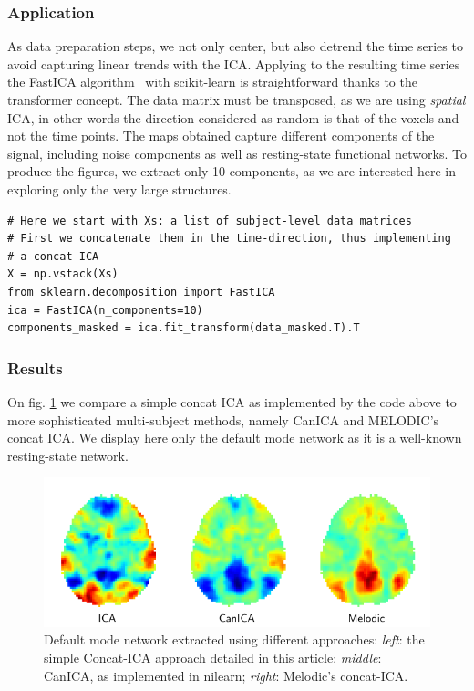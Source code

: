 \documentclass{frontiersSCNS} %
\begin{document}
\subsubsection{Application}

As data preparation steps, we not only center, but also detrend the time
series to avoid capturing linear trends with the ICA. Applying to the
resulting time series the FastICA algorithm~\citep{Hyvarinen:2000vk} with scikit-learn is
straightforward thanks to the transformer concept. The data matrix must
be transposed, as we are using \emph{spatial} ICA, in other words the
direction considered as random is that of the voxels and not the time
points. The maps obtained capture different components of the signal,
including noise components as well as resting-state functional networks.
To produce the figures, we extract only 10 components, as we are
interested here in exploring only the very large structures.

\begin{lstlisting}
# Here we start with Xs: a list of subject-level data matrices
# First we concatenate them in the time-direction, thus implementing
# a concat-ICA
X = np.vstack(Xs)
from sklearn.decomposition import FastICA
ica = FastICA(n_components=10)
components_masked = ica.fit_transform(data_masked.T).T
\end{lstlisting}

\subsubsection{Results}

On fig. \ref{fig:ica} we compare a simple concat ICA as implemented by
the code above to more sophisticated multi-subject methods, namely CanICA
and MELODIC's concat ICA. We display here only the default mode network
as it is a well-known resting-state network.

\begin{figure}[hbtp]
  \centerline{\includegraphics[width=.9\linewidth]{scripts/ica/figure}}
  \caption{Default mode network extracted using different approaches:
\emph{left}: the simple Concat-ICA approach detailed in this article;
\emph{middle}: CanICA, as implemented in nilearn; \emph{right}: Melodic's
concat-ICA.}
  \label{fig:ica}
\end{figure}
\end{document}
